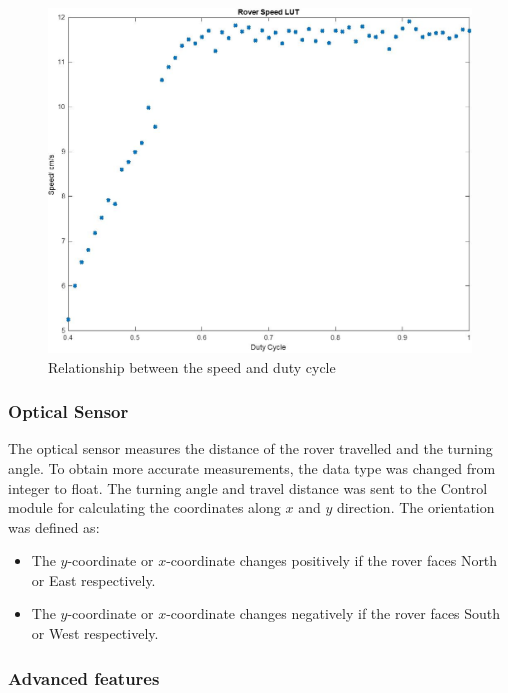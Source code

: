 \documentclass[11pt, a4paper]{article}
\begin{document}
\pagebreak

\begin{figure} [h!]
    \centering
    \includegraphics[scale=0.4]{Speed_duty_cycle.jpg}
    \caption{Relationship between the speed and duty cycle}
    \label{fig:duty}
\end{figure}



\subsubsection{Optical Sensor}

The optical sensor measures the distance of the rover travelled and the turning angle. To obtain more accurate measurements, the data type was changed from integer to float. The turning angle and travel distance was sent to the Control module for calculating the coordinates along $x$ and $y$ direction. The orientation was defined as:
\begin{itemize}
    \item The $y$-coordinate or $x$-coordinate changes positively if the rover faces North or East respectively.
    \item The $y$-coordinate or $x$-coordinate changes negatively if the rover faces South or West respectively.
\end{itemize}

\subsubsection{Advanced features}
\end{document}
